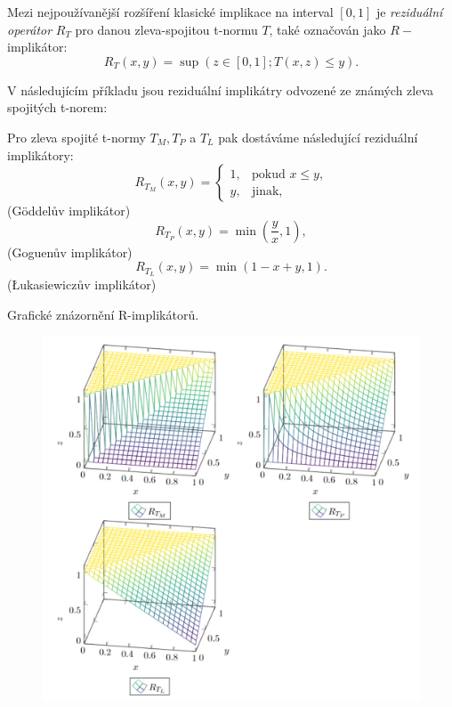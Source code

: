 Mezi nejpoužívanější rozšíření klasické implikace na interval $[0,1]$ je \textit{reziduální operátor} $R_T$ pro danou zleva-spojitou t-normu $T$, také označován jako $R-$implikátor: $$ R_T(x,y)=\sup(z \in [0,1]; T(x,z) \leq y).$$

V následujícím příkladu jsou rezidu\'aln\'i implik\'atry odvozen\'e ze zn\'am\'ych zleva spojit\'ych t-norem:
\begin{example} Pro zleva spojité t-normy $T_M, T_P$ a $T_L$ pak dostáváme  následující reziduální implikátory:
    \cite{Springer}\\
     $$ R_{T_M}(x,y)=\begin{cases} 1, &\mbox {pokud $x\leq y$,} \\y, &\mbox{jinak,} \end{cases} $$
    (Göddel\r uv implik\' ator)
     $$ R_{T_P}(x,y)=\min \left (\frac yx,1 \right ),$$
    (Goguen\r uv implikátor)
     $$ R_{T_L}(x,y)=\min(1-x+y,1).$$
    (\L{}ukasiewicz\r uv implikátor)\\
\end{example}
\begin{graph}
     Grafické znázornění R-implikátor\r u.\\
\begin{figure}[H]
                \hspace{-1cm}
                \includegraphics[scale=0.7]{template-fig/impl4.pdf}
                \centering
            \end{figure}
     

\end{graph}




